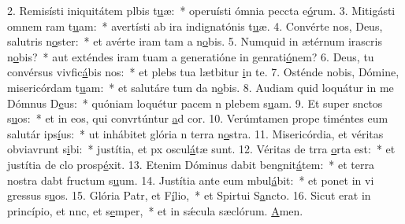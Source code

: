 2. Remisísti iniquitátem plbis t\uline{u}æ:~* operuísti ómnia peccta e\uline{ó}rum.
3. Mitigásti omnem ram t\uline{u}am:~* avertísti ab ira indignatónis t\uline{u}æ.
4. Convérte nos, Deus, salutris n\uline{o}ster:~* et avérte iram tam a n\uline{o}bis.
5. Numquid in ætérnum irascris n\uline{o}bis?~* aut exténdes iram tuam a generatióne in genrati\uline{ó}nem?
6. Deus, tu convérsus vivfic\uline{á}bis nos:~* et plebs tua lætbitur \uline{i}n te.
7. Osténde nobis, Dómine, misericórdam t\uline{u}am:~* et salutáre tum da n\uline{o}bis.
8. Audiam quid loquátur in me Dómnus D\uline{e}us:~* quóniam loquétur pacem n plebem s\uline{u}am.
9. Et super snctos s\uline{u}os:~* et in eos, qui convrtúntur \uline{a}d cor.
10. Verúmtamen prope timéntes eum salutár ips\uline{í}us:~* ut inhábitet glória n terra n\uline{o}stra.
11. Misericórdia, et véritas obviavrunt s\uline{i}bi:~* justítia, et px oscul\uline{á}tæ sunt.
12. Véritas de trra \uline{o}rta est:~* et justítia de clo prosp\uline{é}xit.
13. Etenim Dóminus dabit bengnit\uline{á}tem:~* et terra nostra dabt fructum s\uline{u}um.
14. Justítia ante eum mbul\uline{á}bit:~* et ponet in vi gressus s\uline{u}os.
15. Glória Patr, et F\uline{í}lio,~* et Spirtui S\uline{a}ncto.
16. Sicut erat in princípio, et nnc, et s\uline{e}mper,~* et in sǽcula sæclórum. \uline{A}men.
